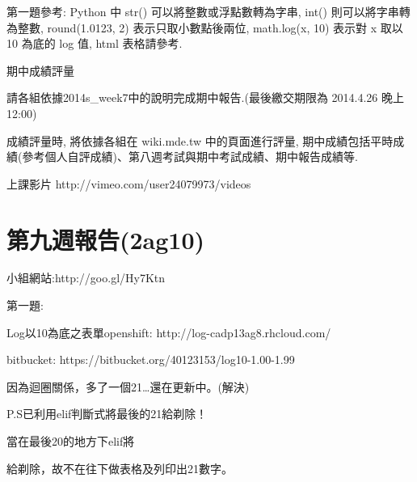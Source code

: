\documentclass[]{article}
\begin{document}
第一題參考: Python 中 str() 可以將整數或浮點數轉為字串, int()
則可以將字串轉為整數, round(1.0123, 2) 表示只取小數點後兩位, math.log(x,
10) 表示對 x 取以 10 為底的 log 值, html 表格請參考.

期中成績評量

請各組依據2014s\_week7中的說明完成期中報告.(最後繳交期限為 2014.4.26
晚上 12:00)

成績評量時, 將依據各組在 wiki.mde.tw 中的頁面進行評量,
期中成績包括平時成績(參考個人自評成績)、第八週考試與期中考試成績、期中報告成績等.

上課影片 http://vimeo.com/user24079973/videos

\section{第九週報告(2ag10)}\label{ux7b2cux4e5dux9031ux5831ux544a2ag10}

小組網站:http://goo.gl/Hy7Ktn

第一題:

Log以10為底之表單openshift: http://log-cadp13ag8.rhcloud.com/

bitbucket: https://bitbucket.org/40123153/log10-1.00-1.99

因為迴圈關係，多了一個21\ldots{}還在更新中。(解決)

P.S已利用elif判斷式將最後的21給剃除！

當在最後20的地方下elif將

給剃除，故不在往下做表格及列印出21數字。
\end{document}
